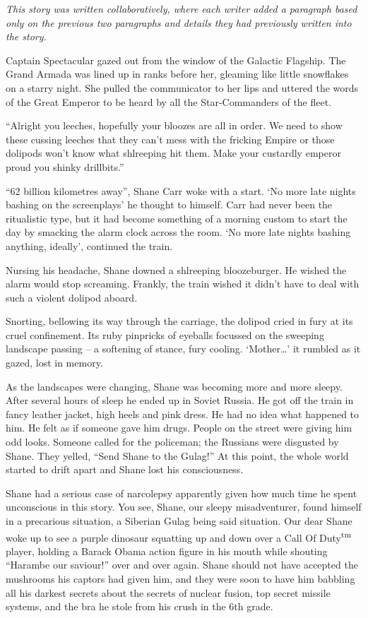 \emph{This story was written collaboratively, where each writer added a paragraph based only on the previous two paragraphs and details they had previously written into the story. }

Captain Spectacular gazed out from the window of the Galactic Flagship. The Grand Armada was lined up in ranks before her, gleaming like little snowflakes on a starry night. She pulled the communicator to her lips and uttered the words of the Great Emperor to be heard by all the Star-Commanders of the fleet. 

“Alright you leeches, hopefully your bloozes are all in order. We need to show these cussing leeches that they can’t mess with the fricking Empire or those dolipods won’t know what shlreeping hit them. Make your custardly emperor proud you shinky drillbits.”

“62  billion kilometres away”, Shane Carr woke with a start. `No more late nights bashing on the screenplays’ he thought to himself. Carr had never been the ritualistic type, but it had become something of a morning custom to start the day by smacking the alarm clock across the room. `No more late nights bashing anything, ideally’, continued the train.

Nursing his headache, Shane downed a shlreeping bloozeburger. He wished the alarm would stop screaming. Frankly, the train wished it didn’t have to deal with such a violent dolipod aboard.

Snorting, bellowing its way through the carriage, the dolipod cried in fury at its cruel confinement. Its ruby pinpricks of eyeballs focussed on the sweeping landscape passing – a softening of stance, fury cooling. ‘Mother…’ it rumbled as it gazed, lost in memory. 

As the landscapes were changing, Shane was becoming more and more sleepy. After several hours of sleep he ended up in Soviet Russia. He got off the train in fancy leather jacket, high heels and pink dress. He had no idea what happened to him. He felt as if someone gave him drugs. People on the street were giving him odd looks. Someone called for the policeman; the Russians were disgusted by Shane. They yelled, ``Send Shane to the Gulag!'' At this point, the whole world started to drift apart and Shane lost his consciousness.

Shane had a serious case of narcolepsy apparently given how much time he spent unconscious in this story. You see, Shane, our sleepy misadventurer, found himself in a precarious situation, a Siberian Gulag being said situation. Our dear Shane woke up to see a purple dinosaur squatting up and down over a Call Of Duty\textsuperscript{tm} player, holding a Barack Obama action figure in his mouth while shouting “Harambe our saviour!” over and over again. Shane should not have accepted the mushrooms his captors had given him, and they were soon to have him babbling all his darkest secrets about the secrets of nuclear fusion, top secret missile systems, and the bra he stole from his crush in the 6th grade.

